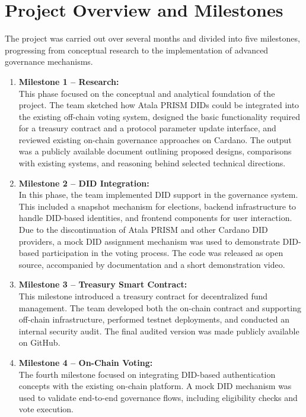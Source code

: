 \documentclass[11pt]{article}
\begin{document}
\section{Project Overview and Milestones}
The project was carried out over several months and divided into five milestones, progressing from conceptual research to the implementation of advanced governance mechanisms.

\begin{enumerate}
    \item \textbf{Milestone 1 – Research:}\\
    This phase focused on the conceptual and analytical foundation of the project.  
    The team sketched how Atala PRISM DIDs could be integrated into the existing off-chain voting system, designed the basic functionality required for a treasury contract and a protocol parameter update interface, and reviewed existing on-chain governance approaches on Cardano.  
    The output was a publicly available document outlining proposed designs, comparisons with existing systems, and reasoning behind selected technical directions.

    \item \textbf{Milestone 2 – DID Integration:}\\
    In this phase, the team implemented DID support in the governance system.  
    This included a snapshot mechanism for elections, backend infrastructure to handle DID-based identities, and frontend components for user interaction.  
    Due to the discontinuation of Atala PRISM and other Cardano DID providers, a mock DID assignment mechanism was used to demonstrate DID-based participation in the voting process.  
    The code was released as open source, accompanied by documentation and a short demonstration video.

    \item \textbf{Milestone 3 – Treasury Smart Contract:}\\
    This milestone introduced a treasury contract for decentralized fund management.  
    The team developed both the on-chain contract and supporting off-chain infrastructure, performed testnet deployments, and conducted an internal security audit.  
    The final audited version was made publicly available on GitHub.

    \item \textbf{Milestone 4 – On-Chain Voting:}\\
    The fourth milestone focused on integrating DID-based authentication concepts with the existing on-chain platform.  
    A mock DID mechanism was used to validate end-to-end governance flows, including eligibility checks and vote execution.


\end{enumerate}
\end{document}

